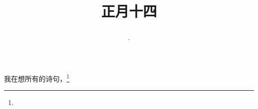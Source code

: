 \title{\date[d=23,m=2,y=2024][year:cn-y,年,month:cn,day:cn,日,·,weekday]·正月十四 }
我在想所有的诗句，\footnote{ }

